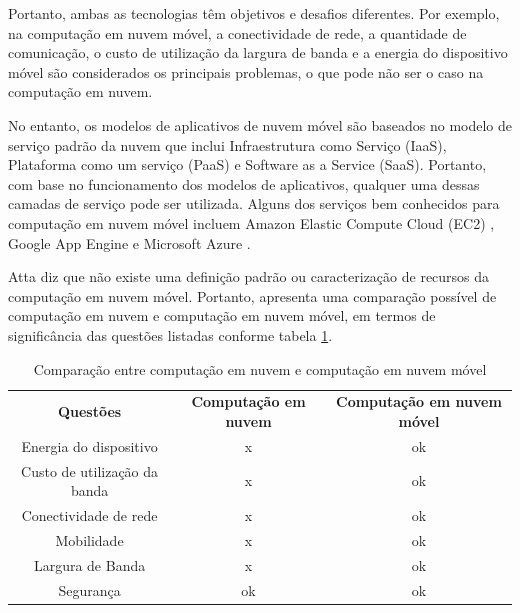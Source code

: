 \documentclass[12pt]{article}
\begin{document}
Portanto, ambas as tecnologias têm objetivos e desafios diferentes. Por exemplo, na computação em nuvem móvel,
a conectividade de rede, a quantidade de comunicação, o custo de utilização da largura de banda e a energia do 
dispositivo móvel são considerados os principais problemas, o que pode não ser o caso na computação em nuvem.

No entanto, os modelos de aplicativos de nuvem móvel são baseados no modelo de serviço padrão da nuvem que inclui 
Infraestrutura como Serviço (IaaS), Plataforma como um serviço (PaaS) e Software as a Service (SaaS). Portanto, 
com base no funcionamento dos modelos de aplicativos, qualquer uma dessas camadas de serviço pode ser utilizada.
Alguns dos serviços bem conhecidos para computação em nuvem móvel incluem Amazon Elastic Compute Cloud (EC2) \cite{amazon}, 
Google App Engine \cite{googleapp} e Microsoft Azure \cite{azure}.

Atta \cite{atta2013} diz que não existe uma definição padrão ou caracterização de recursos da computação em nuvem móvel.
Portanto, apresenta uma comparação possível de computação em nuvem e computação em nuvem móvel, em termos de significância 
das questões listadas conforme tabela \ref{comparisonClouds}.

\begin{table}[h]
  \centering
  {\renewcommand\arraystretch{1.25}
  \begin{tabular}{ l l l }
    \cline{1-1}\cline{2-2}\cline{3-3}  
    \multicolumn{1}{|c|}{\textbf{Questões}} &
    \multicolumn{1}{c|}{\textbf{Computação em nuvem}} &
    \multicolumn{1}{c|}{\textbf{Computação em nuvem móvel}}
    \\  
    \cline{1-1}\cline{2-2}\cline{3-3}  
    \multicolumn{1}{|c|}{Energia do dispositivo} &
    \multicolumn{1}{c|}{x} &
    \multicolumn{1}{c|}{ok}
    \\  
    \cline{1-1}\cline{2-2}\cline{3-3}  
    \multicolumn{1}{|c|}{Custo de utilização da banda} &
    \multicolumn{1}{c|}{x} &
    \multicolumn{1}{c|}{ok}
    \\  
    \cline{1-1}\cline{2-2}\cline{3-3}  
    \multicolumn{1}{|c|}{Conectividade de rede} &
    \multicolumn{1}{c|}{x} &
    \multicolumn{1}{c|}{ok}
    \\  
    \cline{1-1}\cline{2-2}\cline{3-3}  
    \multicolumn{1}{|c|}{Mobilidade} &
    \multicolumn{1}{c|}{x} &
    \multicolumn{1}{c|}{ok}
    \\  
    \cline{1-1}\cline{2-2}\cline{3-3}  
    \multicolumn{1}{|c|}{Largura de Banda} &
    \multicolumn{1}{c|}{x} &
    \multicolumn{1}{c|}{ok}
    \\  
    \cline{1-1}\cline{2-2}\cline{3-3}  
    \multicolumn{1}{|c|}{Segurança} &
    \multicolumn{1}{c|}{ok} &
    \multicolumn{1}{c|}{ok}
    \\  
    \hline
    
  \end{tabular} }
  \caption{Comparação entre computação em nuvem e computação em nuvem móvel} 
  \label{comparisonClouds}
\end{table}
\end{document}
